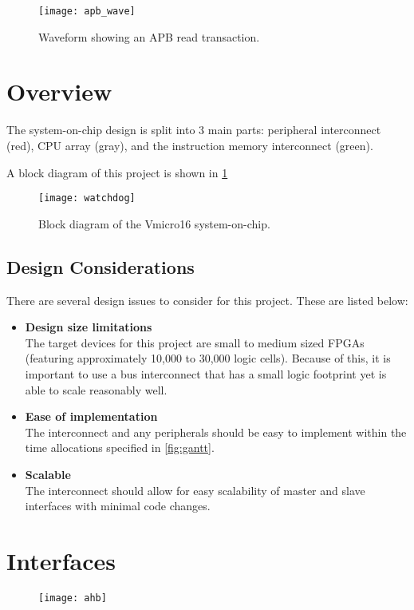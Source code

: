 \begin{figure}[H]
\centering
\texttt{[image: apb\_wave]}
\caption{Waveform showing an APB read transaction.}
\end{figure}

\section{Overview}
The system-on-chip design is split into 3 main parts: peripheral interconnect (red), CPU array (gray), and the instruction memory interconnect (green).

A block diagram of this project is shown in \cref{fig:watchdog}
\begin{figure}[H]
\centering
\texttt{[image: watchdog]}
\caption{Block diagram of the Vmicro16 system-on-chip.}
\label{fig:watchdog}
\end{figure}

\subsection{Design Considerations}
There are several design issues to consider for this project. These are listed below:

\begin{itemize}
\item \textbf{Design size limitations}\\
The target devices for this project are small to medium sized FPGAs (featuring approximately 10,000 to 30,000 logic cells). Because of this, it is important to use a bus interconnect that has a small logic footprint yet is able to scale reasonably well.

\item \textbf{Ease of implementation}\\
The interconnect and any peripherals should be easy to implement within the time allocations specified in \cref{fig:gantt}.

\item \textbf{Scalable}\\
The interconnect should allow for easy scalability of master and slave interfaces with minimal code changes.
\end{itemize}

\section{Interfaces}

\begin{figure}[H]
\centering
\texttt{[image: ahb]}
\end{figure}

